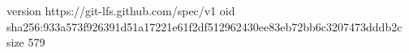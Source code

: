 version https://git-lfs.github.com/spec/v1
oid sha256:933a573f926391d51a17221e61f2df512962430ee83eb72bb6c3207473dddb2c
size 579
